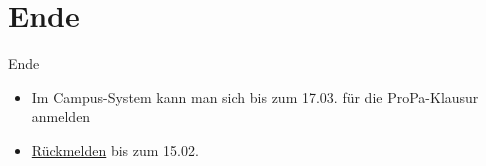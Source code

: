 \documentclass{beamer}
\begin{document}
\section{Ende}

\begin{frame}{Ende}
	\begin{itemize}
		\item Im Campus-System kann man sich bis zum 17.03. für die ProPa-Klausur anmelden
		\item \href{https://campus.studium.kit.edu/renewal/payment.php}{Rückmelden} bis zum 15.02.
	\end{itemize}
\end{frame}
\end{document}
